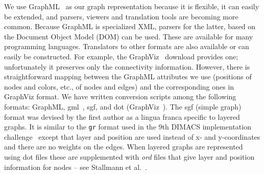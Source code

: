 We use GraphML~\cite{GraphML} as our graph representation because it is flexible, it can
easily be extended, and parsers, viewers and translation tools are becoming
more common.
Because GraphML is
specialized XML, parsers for the latter, based on the Document Object Model
(DOM) can be used. These are available for many programming languages.
Translators to other formats are also available or can easily be constructed.
For example, the GraphViz~\cite{GraphViz} download provides one;
unfortunately it preserves
only
the connectivity information.
However, there is straightforward mapping between the GraphML attributes we
use (positions of nodes and colors, etc., of nodes and edges) and the
corresponding ones in GraphViz format.
We have written conversion scripts among the following formats:
GraphML, gml~\cite{1999-TRPassau-Himsolt}, sgf, and dot (GraphViz~\cite{GraphViz}).
The sgf (simple graph) format was devised by the first author as a
lingua franca specific to layered graphs.
It is similar to the \texttt{gr} format used in the 9th DIMACS implementation
challenge~\cite{2006-DIMACS-Implementation}
except that layer and position are used instead of x- and y-coordinates
and
there are no weights on the edges.
When layered graphs are represented using
dot files these are supplemented with \emph{ord} files
that give layer and position information for nodes
-- see Stallmann et al.~\cite{2001-JEA-Stallmann}.

